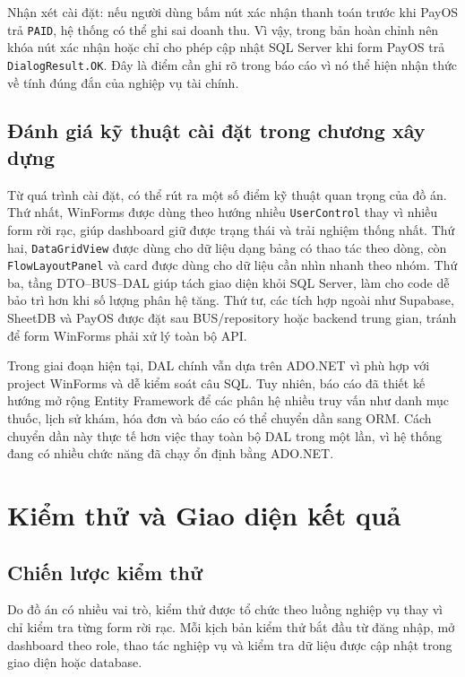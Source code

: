 \documentclass[12pt,a4paper]{article}
\numberwithin{figure}{subsection}
\numberwithin{table}{subsection}
\begin{document}
Nhận xét cài đặt: nếu người dùng bấm nút xác nhận thanh toán trước khi PayOS trả \texttt{PAID}, hệ thống có thể ghi sai doanh thu. Vì vậy, trong bản hoàn chỉnh nên khóa nút xác nhận hoặc chỉ cho phép cập nhật SQL Server khi form PayOS trả \texttt{DialogResult.OK}. Đây là điểm cần ghi rõ trong báo cáo vì nó thể hiện nhận thức về tính đúng đắn của nghiệp vụ tài chính.

\subsection{Đánh giá kỹ thuật cài đặt trong chương xây dựng}

Từ quá trình cài đặt, có thể rút ra một số điểm kỹ thuật quan trọng của đồ án. Thứ nhất, WinForms được dùng theo hướng nhiều \texttt{UserControl} thay vì nhiều form rời rạc, giúp dashboard giữ được trạng thái và trải nghiệm thống nhất. Thứ hai, \texttt{DataGridView} được dùng cho dữ liệu dạng bảng có thao tác theo dòng, còn \texttt{FlowLayoutPanel} và card được dùng cho dữ liệu cần nhìn nhanh theo nhóm. Thứ ba, tầng DTO--BUS--DAL giúp tách giao diện khỏi SQL Server, làm cho code dễ bảo trì hơn khi số lượng phân hệ tăng. Thứ tư, các tích hợp ngoài như Supabase, SheetDB và PayOS được đặt sau BUS/repository hoặc backend trung gian, tránh để form WinForms phải xử lý toàn bộ API.

Trong giai đoạn hiện tại, DAL chính vẫn dựa trên ADO.NET vì phù hợp với project WinForms và dễ kiểm soát câu SQL. Tuy nhiên, báo cáo đã thiết kế hướng mở rộng Entity Framework để các phân hệ nhiều truy vấn như danh mục thuốc, lịch sử khám, hóa đơn và báo cáo có thể chuyển dần sang ORM. Cách chuyển dần này thực tế hơn việc thay toàn bộ DAL trong một lần, vì hệ thống đang có nhiều chức năng đã chạy ổn định bằng ADO.NET.

\section{Kiểm thử và Giao diện kết quả}

\subsection{Chiến lược kiểm thử}

Do đồ án có nhiều vai trò, kiểm thử được tổ chức theo luồng nghiệp vụ thay vì chỉ kiểm tra từng form rời rạc. Mỗi kịch bản kiểm thử bắt đầu từ đăng nhập, mở dashboard theo role, thao tác nghiệp vụ và kiểm tra dữ liệu được cập nhật trong giao diện hoặc database.
\end{document}
